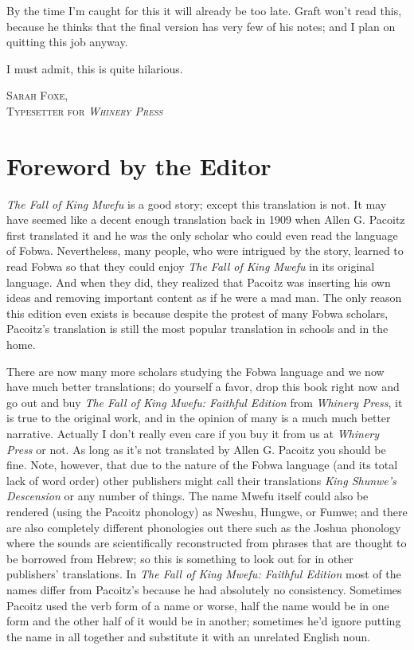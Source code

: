 By the time I'm caught for this it will already be too late. Graft won't read this, because he thinks that the final version has very few of his notes; and I plan on quitting this job anyway.

I must admit, this is quite hilarious.
\begin{flushright}
\textsc{
Sarah Foxe,\\
Typesetter for \emph{Whinery Press}}
\clearpage
\end{flushright}



\chapter*{Foreword by the Editor}
\emph{The Fall of King Mwe\-fu} is a good story; except this translation is not.
It may have seemed like a decent enough translation back in 1909 when Allen G. Pa\-co\-itz first translated it and he was the only scholar who could even read the language of Fo\-bwa.
Nevertheless, many people, who were intrigued by the story, learned to read Fo\-bwa so that they could enjoy \emph{The Fall of King Mwe\-fu} in its original language.
And when they did, they realized that Pa\-co\-itz was inserting his own ideas and removing important content as if he were a mad man.
The only reason this edition even exists is because despite the protest of many Fo\-bwa scholars, Pa\-co\-itz's translation is still the most popular translation in schools and in the home. 

There are now many more scholars studying the Fo\-bwa language and we now have much better translations;
do yourself a favor, drop this book right now and go out and buy \emph{The Fall of King Mwe\-fu: Faithful Edition} from \emph{Whinery Press}, it is true to the original work, and in the opinion of many is a much much better narrative.
Actually I don't really even care if you buy it from us at \emph{Whinery Press} or not.
As long as it's not translated by Allen G. Pa\-co\-itz you should be fine.
Note, however, that due to the nature of the Fo\-bwa language (and its total lack of word order) other publishers might call their translations \emph{King Shunwe's Descension} or any number of things. The name Mwe\-fu itself could also be rendered (using the Pa\-co\-itz phonology) as Nweshu, Hungwe, or Fumwe; and there are also completely different phonologies out there such as the Joshua phonology where the sounds are scientifically reconstructed from phrases that are thought to be borrowed from Hebrew; so this is something to look out for in other publishers' translations. In \emph{The Fall of King Mwe\-fu: Faithful Edition} most of the names differ from Pa\-co\-itz's because he had absolutely no consistency. Sometimes Pa\-co\-itz used the verb form of a name or worse, half the name would be in one form and the other half of it would be in another; sometimes he'd ignore putting the name in all together and substitute it with an unrelated English noun.

